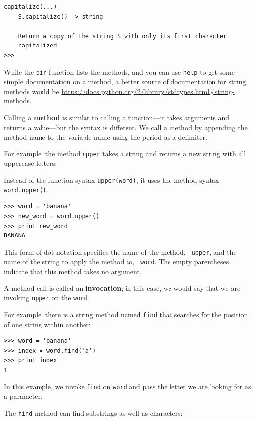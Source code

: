 {\begin{verbatim}
capitalize(...)
    S.capitalize() -> string
    
    Return a copy of the string S with only its first character
    capitalized.
>>>
\end{verbatim}
\afterverb
%

While the {\tt dir} function lists the methods, and you 
can use {\tt help} to get some simple documentation on a method, 
a better source of documentation for string methods would be
\url{https://docs.python.org/2/library/stdtypes.html#string-methods}.

Calling a {\bf method} is similar to calling a function---it 
takes arguments and returns a value---but the syntax is different.
We call a method by appending the method name to the variable name
using the period as a delimiter.

For example, the
method {\tt upper} takes a string and returns a new string with
all uppercase letters:


Instead of the function syntax {\tt upper(word)}, it uses
the method syntax {\tt word.upper()}.


\beforeverb
\begin{verbatim}
>>> word = 'banana'
>>> new_word = word.upper()
>>> print new_word
BANANA
\end{verbatim}
\afterverb
%
This form of dot notation specifies the name of the method, {\tt
upper}, and the name of the string to apply the method to, {\tt
word}.  The empty parentheses indicate that this method takes no
argument.


A method call is called an {\bf invocation}; in this case, we would
say that we are invoking {\tt upper} on the {\tt word}.


For example, there is a string method named {\tt find} that
searches for the position of one string within another:

\beforeverb
\begin{verbatim}
>>> word = 'banana'
>>> index = word.find('a')
>>> print index
1
\end{verbatim}
\afterverb
%
In this example, we invoke {\tt find} on {\tt word} and pass
the letter we are looking for as a parameter.

The {\tt find} method can find substrings as well as characters:

}
